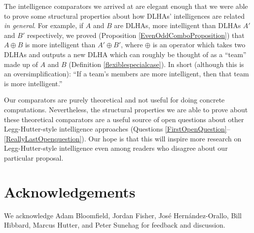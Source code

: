\documentclass[twoside,11pt]{article}
\begin{document}
The intelligence comparators we arrived at are elegant enough that
we were able to prove some structural properties about how DLHAs'
intelligences are related \emph{in general}. For example, if $A$ and $B$ are
DLHAs, more intelligent than DLHAs $A'$ and $B'$ respectively, we proved
(Proposition \ref{EvenOddComboProposition}) that
$A\oplus B$ is more intelligent than $A'\oplus B'$, where $\oplus$ is an
operator which takes two DLHAs and outputs a new DLHA which can roughly
be thought of as a ``team'' made up of $A$ and $B$
(Definition \ref{flexiblespecialcase}).
In short (although this is an oversimplification):
``If a team's members are more intelligent, then that team is more intelligent.''

Our comparators are purely theoretical and not useful
for doing concrete computations. Nevertheless, the structural
properties we are able to prove about these theoretical comparators
are a useful source of open questions about other Legg-Hutter-style
intelligence approaches (Questions \ref{FirstOpenQuestion}--\ref{ReallyLastOpenquestion}).
Our hope is that this will inspire more research on Legg-Hutter-style intelligence
even among readers who disagree about our particular proposal.

\section*{Acknowledgements}


We acknowledge Adam Bloomfield, Jordan Fisher,
Jos{\'e} Hern{\'a}ndez-Orallo,
Bill Hibbard, Marcus Hutter, and Peter Sunehag for feedback and discussion.



\end{document}
